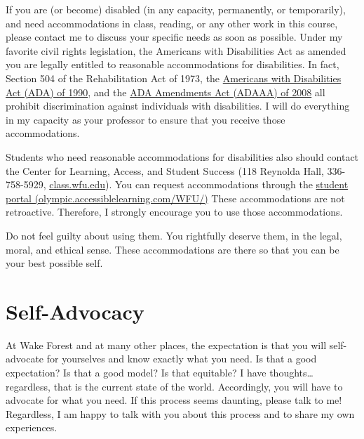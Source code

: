 If you are (or become) disabled (in any capacity, permanently, or temporarily), and need accommodations in class, reading, or any other work in this course, please contact me to discuss your specific needs as soon as possible.
Under my favorite civil rights legislation, the Americans with Disabilities Act as amended you are legally entitled to reasonable accommodations for disabilities. In fact, Section 504 of the Rehabilitation Act of 1973, the \href{https://beta.ada.gov/}{Americans with Disabilities Act (ADA) of 1990}, and the \href{https://en.wikipedia.org/wiki/ADA_Amendments_Act_of_2008}{ADA Amendments Act (ADAAA) of 2008} all prohibit discrimination against individuals with disabilities.
I will do everything in my capacity as your professor to ensure that you receive those accommodations.

Students who need reasonable accommodations for disabilities also should contact the Center for Learning, Access, and Student Success (118 Reynolda Hall, 336-758-5929, \href{https://class.wfu.edu/}{class.wfu.edu}). You can request accommodations through the \href{https://olympic.accessiblelearning.com/WFU/}{student portal (olympic.accessiblelearning.com/WFU/)} These accommodations are not retroactive. Therefore, I strongly encourage you to use those accommodations.

Do not feel guilty about using them.
You rightfully deserve them, in the legal, moral, and ethical sense.
These accommodations are there so that you can be your best possible self.

\hypertarget{self-advocacy}{%
\section{Self-Advocacy}\label{self-advocacy}}

At Wake Forest and at many other places, the expectation is that you will self-advocate for yourselves and know exactly what you need. Is that a good expectation? Is that a good model? Is that equitable? I have thoughts\ldots{} regardless, that is the current state of the world. Accordingly, you will have to advocate for what you need. If this process seems daunting, please talk to me! Regardless, I am happy to talk with you about this process and to share my own experiences.

